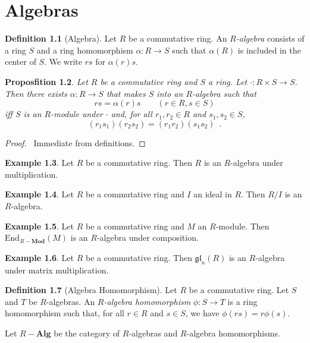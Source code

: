 \documentclass{book}
\let\qed\relax
\newtheorem{prop}{Proposfition}[chapter]
\theoremstyle{definition}
\newtheorem{df}[prop]{Definition}
\newtheorem{ex}[prop]{Example}
\newcommand{\Alg}[1]{\ensuremath{{#1}-\mathbf{Alg}}}
\newcommand{\End}[2]{\ensuremath{\mathrm{End}_{#1} \left( {#2} \right)}}
\newcommand{\gl}[2]{\ensuremath{\mathfrak{gl}_{#1} \left( {#2} \right)}}
\newcommand{\Mod}[1]{\ensuremath{{#1}-\mathbf{Mod}}}
\begin{document}
\chapter{Algebras}

\begin{df}[Algebra]
Let $R$ be a commutative ring. An \emph{$R$-algebra} consists of a ring $S$ and a ring homomorphism $\alpha : R \rightarrow S$ such that $\alpha(R)$ is included in the center of $S$. We write $rs$ for $\alpha(r)s$.
\end{df}

\begin{prop}
Let $R$ be a commutative ring and $S$ a ring. Let $\cdot : R \times S \rightarrow S$. Then there exists $\alpha : R \rightarrow S$ that makes $S$ into an $R$-algebra such that
\[ rs = \alpha(r)s \qquad (r \in R, s \in S) \]
iff $S$ is an $R$-module under $\cdot$ and, for all $r_1,r_2 \in R$ and $s_1,s_2 \in S$,
\[ (r_1 s_1)(r_2 s_2) = (r_1 r_2)(s_1 s_2) \enspace . \]
\end{prop}

\begin{proof}
\pf\ Immediate from definitions. \qed
\end{proof}

\begin{ex}
Let $R$ be a commutative ring. Then $R$ is an $R$-algebra under multiplication.
\end{ex}

\begin{ex}
Let $R$ be a commutative ring and $I$ an ideal in $R$. Then $R/I$ is an $R$-algebra.
\end{ex}

\begin{ex}
Let $R$ be a commutative ring and $M$ an $R$-module. Then $\End{\Mod{R}}{M}$ is an $R$-algebra under composition.
\end{ex}

\begin{ex}
Let $R$ be a commutative ring. Then $\gl{n}{R}$ is an $R$-algebra under matrix multiplication.
\end{ex}

\begin{df}[Algebra Homomorphism]
Let $R$ be a commutative ring. Let $S$ and $T$ be $R$-algebras. An \emph{$R$-algebra homomorphism} $\phi : S \rightarrow T$ is a ring homomorphism such that, for all $r \in R$ and $s \in S$, we have $\phi(rs) = r\phi(s)$.

Let $\Alg{R}$ be the category of $R$-algebras and $R$-algebra homomorphisms.
\end{df}
\end{document}

